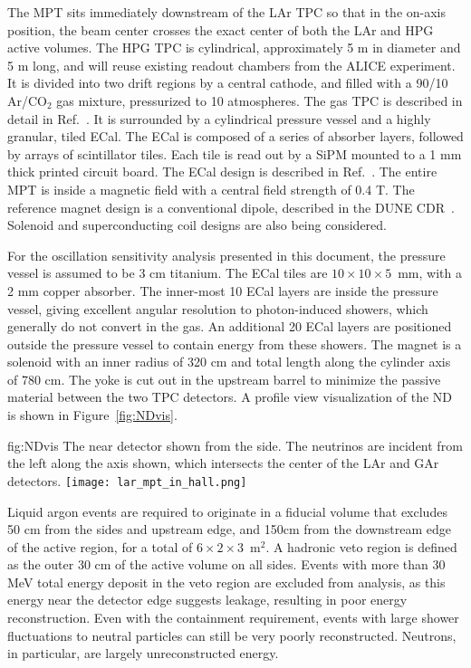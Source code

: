 The MPT sits immediately downstream of the LAr TPC so that in the on-axis position, the beam center crosses the exact center of both the LAr and HPG active volumes. The HPG TPC is cylindrical, approximately 5 m in diameter and 5 m long, and will reuse existing readout chambers from the ALICE experiment. It is divided into two drift regions by a central cathode, and filled with a 90/10 Ar/CO$_{2}$ gas mixture, pressurized to 10 atmospheres. The gas TPC is described in detail in Ref.~\cite{gasTPC}. It is surrounded by a cylindrical pressure vessel and a highly granular, tiled ECal. The ECal is composed of a series of absorber layers, followed by arrays of scintillator tiles. Each tile is read out by a SiPM mounted to a 1 mm thick printed circuit board. The ECal design is described in Ref.~\cite{CALICEecal}. The entire MPT is inside a magnetic field with a central field strength of 0.4 T. The reference magnet design is a conventional dipole, described in the DUNE CDR~\cite{cdr-vol-4}. Solenoid and superconducting coil designs are also being considered.

For the oscillation sensitivity analysis presented in this document, the pressure vessel is assumed to be 3 cm titanium. The ECal tiles are $10 \times 10 \times 5$~mm, with a 2 mm copper absorber. The inner-most 10 ECal layers are inside the pressure vessel, giving excellent angular resolution to photon-induced showers, which generally do not convert in the gas. An additional 20 ECal layers are positioned outside the pressure vessel to contain energy from these showers. The magnet is a solenoid with an inner radius of 320 cm and total length along the cylinder axis of 780 cm. The yoke is cut out in the upstream barrel to minimize the passive material between the two TPC detectors. A profile view visualization of the ND is shown in Figure~\ref{fig:NDvis}.

\begin{dunefigure}[ND visualization]{fig:NDvis}
{The near detector shown from the side. The neutrinos are incident from the left along the axis shown, which intersects the center of the LAr and GAr detectors.}
 \texttt{[image: lar\_mpt\_in\_hall.png]}
\end{dunefigure}

Liquid argon events are required to originate in a fiducial volume that excludes 50 cm from the sides and upstream edge, and 150cm from the downstream edge of the active region, for a total of $6 \times 2 \times 3$~m$^{2}$. A hadronic veto region is defined as the outer 30 cm of the active volume on all sides. Events with more than 30 MeV total energy deposit in the veto region are excluded from analysis, as this energy near the detector edge suggests leakage, resulting in poor energy reconstruction. Even with the containment requirement, events with large shower fluctuations to neutral particles can still be very poorly reconstructed. Neutrons, in particular, are largely unreconstructed energy.

